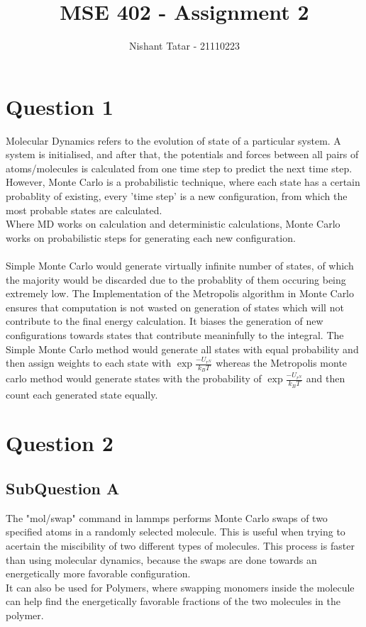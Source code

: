 \documentclass[11pt]{article}
\title{MSE 402 - Assignment 2}
\date{}
\author{Nishant Tatar - 21110223}
\begin{document}
\maketitle

\section{Question 1}
Molecular Dynamics refers to the evolution of state of a particular system. A system is initialised, and after that, the potentials and forces between all pairs of atoms/molecules is calculated from one time step to predict the next time step. However, Monte Carlo is a probabilistic technique, where each state has a certain probablity of existing, every 'time step' is a new configuration, from which the most probable states are calculated. \\
Where MD works on calculation and deterministic calculations, Monte Carlo works on probabilistic steps for generating each new configuration.\\ \\
Simple Monte Carlo would generate virtually infinite number of states, of which the majority would be discarded due to the probablity of them occuring being extremely low. The Implementation of the Metropolis algorithm in Monte Carlo ensures that computation is not wasted on generation of states which will not contribute to the final energy calculation. It biases the generation of new configurations towards states that contribute meaninfully to the integral. 
The Simple Monte Carlo method would generate all states with equal probability and then assign weights to each state with $\exp{\frac{-U_{r^N}}{k_{B}T}}$ whereas the Metropolis monte carlo method would generate states with the probability of $\exp{\frac{-U_{r^N}}{k_{B}T}}$ and then count each generated state equally.

\section{Question 2}
\subsection{SubQuestion A}
The "mol/swap" command in lammps performs Monte Carlo swaps of two specified atoms in a randomly selected molecule. This is useful when trying to acertain the miscibility of two different types of molecules. This process is faster than using molecular dynamics, because the swaps are done towards an energetically more favorable configuration.\\
It can also be used for Polymers, where swapping monomers inside the molecule can help find the energetically favorable fractions of the two molecules in the polymer.
\end{document}
